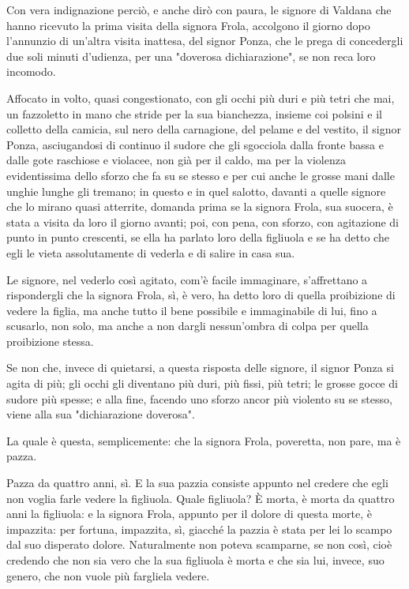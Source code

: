 \documentclass[12pt]{book}
\begin{document}
Con vera indignazione perciò, e anche dirò con paura, le signore di Valdana che hanno ricevuto la prima visita della signora Frola, accolgono il giorno dopo l’annunzio di un’altra visita inattesa, del signor Ponza, che le prega di concedergli due soli minuti d’udienza, per una "doverosa dichiarazione", se non reca loro incomodo.

Affocato in volto, quasi congestionato, con gli occhi più duri e più tetri che mai, un fazzoletto in mano che stride per la sua bianchezza, insieme coi polsini e il colletto della camicia, sul nero della carnagione, del pelame e del vestito, il signor Ponza, asciugandosi di continuo il sudore che gli sgocciola dalla fronte bassa e dalle gote raschiose e violacee, non già per il caldo, ma per la violenza evidentissima dello sforzo che fa su se stesso e per cui anche le grosse mani dalle unghie lunghe gli tremano; in questo e in quel salotto, davanti a quelle signore che lo mirano quasi atterrite, domanda prima se la signora Frola, sua suocera, è stata a visita da loro il giorno avanti; poi, con pena, con sforzo, con agitazione di punto in punto crescenti, se ella ha parlato loro della figliuola e se ha detto che egli le vieta assolutamente di vederla e di salire in casa sua.

Le signore, nel vederlo così agitato, com’è facile immaginare, s’affrettano a rispondergli che la signora Frola, sì, è vero, ha detto loro di quella proibizione di vedere la figlia, ma anche tutto il bene possibile e immaginabile di lui, fino a scusarlo, non solo, ma anche a non dargli nessun’ombra di colpa per quella proibizione stessa.

Se non che, invece di quietarsi, a questa risposta delle signore, il signor Ponza si agita di più; gli occhi gli diventano più duri, più fissi, più tetri; le grosse gocce di sudore più spesse; e alla fine, facendo uno sforzo ancor più violento su se stesso, viene alla sua "dichiarazione doverosa".

La quale è questa, semplicemente: che la signora Frola, poveretta, non pare, ma è pazza.

Pazza da quattro anni, sì. E la sua pazzia consiste appunto nel credere che egli non voglia farle vedere la figliuola. Quale figliuola? È morta, è morta da quattro anni la figliuola: e la signora Frola, appunto per il dolore di questa morte, è impazzita: per fortuna, impazzita, sì, giacché la pazzia è stata per lei lo scampo dal suo disperato dolore. Naturalmente non poteva scamparne, se non così, cioè credendo che non sia vero che la sua figliuola è morta e che sia lui, invece, suo genero, che non vuole più fargliela vedere.
\end{document}
